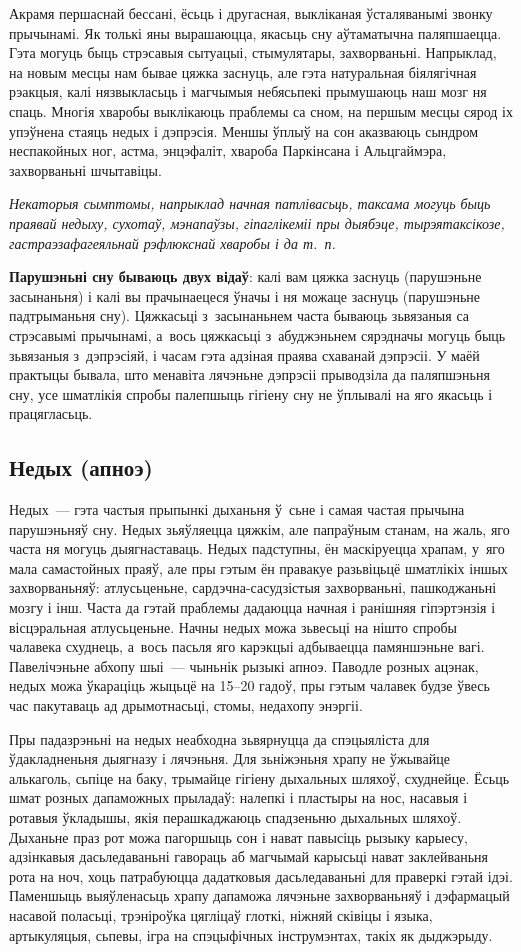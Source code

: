 Акрамя першаснай бессані, ёсьць і другасная, выкліканая ўсталяванымі звонку прычынамі. Як толькі яны вырашаюцца, якасьць сну аўтаматычна паляпшаецца. Гэта могуць быць стрэсавыя сытуацыі, стымулятары, захворваньні. Напрыклад, на новым месцы нам бывае цяжка заснуць, але гэта натуральная біялягічная рэакцыя, калі нязвыкласьць і магчымыя небясьпекі прымушаюць наш мозг ня спаць. Многія хваробы выклікаюць праблемы са сном, на першым месцы сярод іх упэўнена стаяць недых і дэпрэсія. Меншы ўплыў на сон аказваюць сындром неспакойных ног, астма, энцэфаліт, хвароба Паркінсана і Альцгаймэра, захворваньні шчытавіцы. 

\emph{Некаторыя сымптомы, напрыклад начная патлівасьць, таксама могуць быць праявай недыху, сухотаў, мэнапаўзы, гіпаглікеміі пры дыябэце, тырэятаксікозе, гастраэзафагеяльнай рэфлюкснай хваробы і да т.~п.}

\textbf{Парушэньні сну бываюць двух відаў}: калі вам цяжка заснуць (парушэньне засынаньня) і калі вы прачынаецеся ўначы і ня можаце заснуць (парушэньне падтрыманьня сну). Цяжкасьці з~засынаньнем часта бываюць зьвязаныя са стрэсавымі прычынамі, а~вось цяжкасьці з~абуджэньнем сярэдначы могуць быць зьвязаныя з~дэпрэсіяй, і часам гэта адзіная праява схаванай дэпрэсіі. У маёй практыцы бывала, што менавіта лячэньне дэпрэсіі прыводзіла да паляпшэньня сну, усе шматлікія спробы палепшыць гігіену сну не ўплывалі на яго якасьць і працягласьць.

\subsection*{Недых (апноэ)}

Недых~--- гэта частыя прыпынкі дыханьня ў~сьне і самая частая прычына парушэньняў сну. Недых зьяўляецца цяжкім, але папраўным станам, на жаль, яго часта ня могуць дыягнаставаць. Недых падступны, ён маскіруецца храпам, у~яго мала самастойных праяў, але пры гэтым ён правакуе разьвіцьцё шматлікіх іншых захворваньняў: атлусьценьне, сардэчна-сасудзістыя захворваньні, пашкоджаньні мозгу і інш. Часта да гэтай праблемы дадаюцца начная і ранішняя гіпэртэнзія і вісцэральная атлусьценьне. Начны недых можа зьвесьці на нішто спробы чалавека схуднець, а~вось пасьля яго карэкцыі адбываецца памяншэньне вагі. Павелічэньне абхопу шыі~--- чыньнік рызыкі апноэ. Паводле розных ацэнак, недых можа ўкараціць жыцьцё на 15--20 гадоў, пры гэтым чалавек будзе ўвесь час пакутаваць ад дрымотнасьці, стомы, недахопу энэргіі.

Пры падазрэньні на недых неабходна зьвярнуцца да спэцыяліста для ўдакладненьня дыягназу і лячэньня. Для зьніжэньня храпу не ўжывайце алькаголь, сьпіце на баку, трымайце гігіену дыхальных шляхоў, схуднейце. Ёсьць шмат розных дапаможных прыладаў: налепкі і пластыры на нос, насавыя і ротавыя ўкладышы, якія перашкаджаюць спадзеньню дыхальных шляхоў. Дыханьне праз рот можа пагоршыць сон і нават павысіць рызыку карыесу, адзінкавыя дасьледаваньні гавораць аб магчымай карысьці нават заклейваньня рота на ноч, хоць патрабуюцца дадатковыя дасьледаваньні для праверкі гэтай ідэі. Паменшыць выяўленасьць храпу дапаможа лячэньне захворваньняў і дэфармацый насавой поласьці, трэніроўка цягліцаў глоткі, ніжняй сківіцы і языка, артыкуляцыя, сьпевы, ігра на спэцыфічных інструмэнтах, такіх як дыджэрыду.

